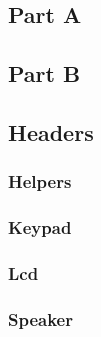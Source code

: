 \documentclass[letterpaper, 12pt]{article}
\begin{document}
\subsection*{Part A}

\subsection*{Part B}

\subsection*{Headers}
\subsubsection*{Helpers}

\subsubsection*{Keypad}

\subsubsection*{Lcd}

\subsubsection*{Speaker}

\end{document}

